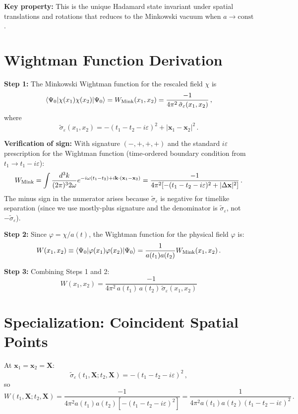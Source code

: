 \documentclass[12pt]{article}
\newcommand{\Scfac}{a}
\newcommand{\Wight}{W}
\newcommand{\be}{\begin{equation}}
\newcommand{\ee}{\end{equation}}
\begin{document}
\textbf{Key property:} This is the unique Hadamard state invariant under
spatial translations and rotations that reduces to the Minkowski vacuum
when $\Scfac \to \text{const}$.

\section{Wightman Function Derivation}

\textbf{Step 1:} The Minkowski Wightman function for the rescaled field $\chi$ is
\be
  \langle \Psi_0 | \chi(x_1) \chi(x_2) | \Psi_0 \rangle
  = W_{\rm Mink}(x_1, x_2)
  = \frac{-1}{4\pi^2 \, \tilde{\sigma}_\varepsilon(x_1, x_2)} \,,
\ee
where
\be
  \tilde{\sigma}_\varepsilon(x_1, x_2) = -(t_1 - t_2 - i\varepsilon)^2 + |\mathbf{x}_1 - \mathbf{x}_2|^2 \,.
\ee

\textbf{Verification of sign:} With signature $(-,+,+,+)$ and the standard
$i\varepsilon$ prescription for the Wightman function (time-ordered boundary
condition from $t_1 \to t_1 - i\varepsilon$):
\be
  W_{\rm Mink} = \int \frac{d^3k}{(2\pi)^3 2\omega} e^{-i\omega(t_1-t_2) + i\mathbf{k}\cdot(\mathbf{x}_1-\mathbf{x}_2)}
  = \frac{-1}{4\pi^2 [-(t_1-t_2-i\varepsilon)^2 + |\Delta\mathbf{x}|^2]} \,.
\ee
The minus sign in the numerator arises because $\tilde{\sigma}_\varepsilon$ is
negative for timelike separation (since we use mostly-plus signature and the
denominator is $\tilde{\sigma}_\varepsilon$, not $-\tilde{\sigma}_\varepsilon$).

\textbf{Step 2:} Since $\varphi = \chi / \Scfac(t)$, the Wightman function
for the physical field $\varphi$ is:
\be
  \Wight(x_1, x_2) \equiv \langle \Psi_0 | \varphi(x_1) \varphi(x_2) | \Psi_0 \rangle
  = \frac{1}{\Scfac(t_1) \Scfac(t_2)} W_{\rm Mink}(x_1, x_2) \,.
\ee

\textbf{Step 3:} Combining Steps 1 and 2:
\be
  \boxed{
  \Wight(x_1, x_2)
  = \frac{-1}{4\pi^2 \, \Scfac(t_1) \, \Scfac(t_2) \, \tilde{\sigma}_\varepsilon(x_1, x_2)}
  }
  \label{eq:Wight-FLRW}
\ee

\section{Specialization: Coincident Spatial Points}

At $\mathbf{x}_1 = \mathbf{x}_2 = \mathbf{X}$:
\be
  \tilde{\sigma}_\varepsilon(t_1, \mathbf{X}; t_2, \mathbf{X})
  = -(t_1 - t_2 - i\varepsilon)^2 \,,
\ee
so
\be
  \Wight(t_1, \mathbf{X}; t_2, \mathbf{X})
  = \frac{-1}{4\pi^2 \Scfac(t_1) \Scfac(t_2) [-(t_1-t_2-i\varepsilon)^2]}
  = \frac{1}{4\pi^2 \Scfac(t_1) \Scfac(t_2) (t_1-t_2-i\varepsilon)^2} \,.
\ee
\end{document}
